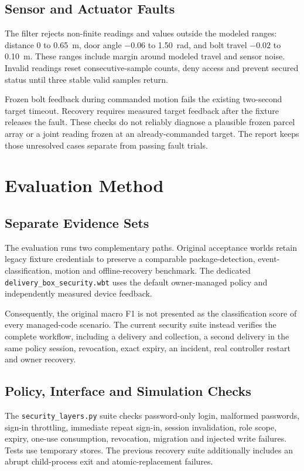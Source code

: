\documentclass[conference,letterpaper]{IEEEtran}
\newcommand{\code}[1]{\texttt{\small #1}}
\begin{document}
\subsection{Sensor and Actuator Faults}
The filter rejects non-finite readings and values outside the modeled ranges: distance 0 to 0.65~m, door angle $-0.06$ to 1.50~rad, and bolt travel $-0.02$ to 0.10~m. These ranges include margin around modeled travel and sensor noise. Invalid readings reset consecutive-sample counts, deny access and prevent secured status until three stable valid samples return.

Frozen bolt feedback during commanded motion fails the existing two-second target timeout. Recovery requires measured target feedback after the fixture releases the fault. These checks do not reliably diagnose a plausible frozen parcel array or a joint reading frozen at an already-commanded target. The report keeps those unresolved cases separate from passing fault trials.

\section{Evaluation Method}
\subsection{Separate Evidence Sets}
The evaluation runs two complementary paths. Original acceptance worlds retain legacy fixture credentials to preserve a comparable package-detection, event-classification, motion and offline-recovery benchmark. The dedicated \code{delivery\_box\_security.wbt} uses the default owner-managed policy and independently measured device feedback.

Consequently, the original macro F1 is not presented as the classification score of every managed-code scenario. The current security suite instead verifies the complete workflow, including a delivery and collection, a second delivery in the same policy session, revocation, exact expiry, an incident, real controller restart and owner recovery.

\subsection{Policy, Interface and Simulation Checks}
The \code{security\_layers.py} suite checks password-only login, malformed passwords, sign-in throttling, immediate repeat sign-in, session invalidation, role scope, expiry, one-use consumption, revocation, migration and injected write failures. Tests use temporary stores. The previous recovery suite additionally includes an abrupt child-process exit and atomic-replacement failures.
\end{document}
